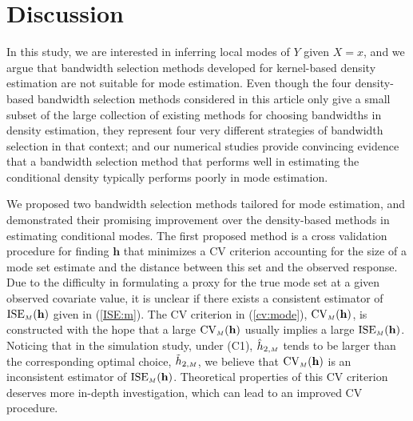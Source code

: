 \documentclass[fleqn,12pt,twoside]{article}
\newcommand{\bh}{\mathbf{h}}
\numberwithin{equation}{section}
\begin{document}
\section{Discussion}
\label{s:diss}
In this study, we are interested in inferring local modes of $Y$ given $X=x$, and we argue that bandwidth selection methods developed for kernel-based density estimation are not suitable for mode estimation. Even though the four density-based bandwidth selection methods considered in this article only give a small subset of the large collection of existing methods for choosing bandwidths in density estimation, they represent four very different strategies of bandwidth selection in that context; and our numerical studies provide convincing evidence that a bandwidth selection method that performs well in estimating the conditional density typically performs poorly in mode estimation. 

We proposed two bandwidth selection methods tailored for mode estimation, and demonstrated their promising improvement over the density-based methods in estimating conditional modes. The first proposed method is a cross validation procedure for finding $\bh$ that minimizes a CV criterion accounting for the size of a mode set estimate and the distance between this set and the observed response. Due to the difficulty in formulating a proxy for the true mode set at a given observed covariate value, it is unclear if there exists a consistent estimator of $\textrm{ISE}_{\hbox {\tiny $M$}}(\bh)$ given in (\ref{ISE:m}). The CV criterion in (\ref{cv:mode}), $\textrm{CV}_{\hbox {\tiny $M$}}(\bh)$, is constructed with the hope that a large $\textrm{CV}_{\hbox {\tiny $M$}}(\bh)$ usually implies a large $\textrm{ISE}_{\hbox {\tiny $M$}}(\bh)$. Noticing that in the simulation study, under (C1), $\hat h_{2, \hbox {\tiny $M$}}$ tends to be larger than the corresponding optimal choice, $\tilde h_{2, \hbox {\tiny $M$}}$, we believe that $\textrm{CV}_{\hbox {\tiny $M$}}(\bh)$ is an inconsistent estimator of $\textrm{ISE}_{\hbox {\tiny $M$}}(\bh)$. Theoretical properties of this CV criterion deserves more in-depth investigation, which can lead to an improved CV procedure.  
\end{document}
